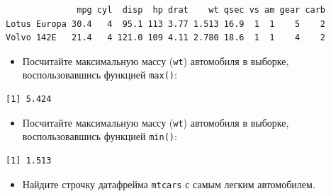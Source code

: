 \documentclass[
]{book}
\newenvironment{Shaded}{\begin{snugshade}}{\end{snugshade}}
\newcommand{\KeywordTok}[1]{\textcolor[rgb]{0.13,0.29,0.53}{\textbf{#1}}}
\newcommand{\NormalTok}[1]{#1}
\newcommand{\OperatorTok}[1]{\textcolor[rgb]{0.81,0.36,0.00}{\textbf{#1}}}
\newcommand{\StringTok}[1]{\textcolor[rgb]{0.31,0.60,0.02}{#1}}
\providecommand{\tightlist}{%
  \setlength{\itemsep}{0pt}\setlength{\parskip}{0pt}}
\begin{document}
\begin{verbatim}
              mpg cyl  disp  hp drat    wt qsec vs am gear carb
Lotus Europa 30.4   4  95.1 113 3.77 1.513 16.9  1  1    5    2
Volvo 142E   21.4   4 121.0 109 4.11 2.780 18.6  1  1    4    2
\end{verbatim}

\begin{itemize}
\tightlist
\item
  Посчитайте максимальную массу (\texttt{wt}) автомобиля в выборке, воспользовавшись функцией \texttt{max()}:
\end{itemize}

\begin{Shaded}
\end{Shaded}

\begin{verbatim}
[1] 5.424
\end{verbatim}

\begin{itemize}
\tightlist
\item
  Посчитайте максимальную массу (\texttt{wt}) автомобиля в выборке, воспользовавшись функцией \texttt{min()}:
\end{itemize}

\begin{Shaded}
\end{Shaded}

\begin{verbatim}
[1] 1.513
\end{verbatim}

\begin{itemize}
\tightlist
\item
  Найдите строчку датафрейма \texttt{mtcars} с самым легким автомобилем.
\end{itemize}

\begin{Shaded}
\end{Shaded}
\end{document}
